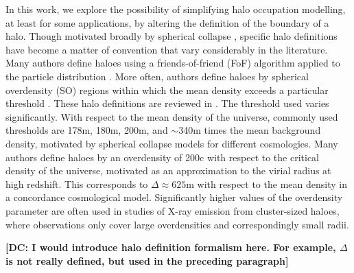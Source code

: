\documentclass[usenatbib,fleqn]{mnras}
\begin{document}
In this work, we explore the possibility of simplifying halo occupation modelling, at least for some applications, by altering the definition of the boundary of a halo. Though motivated broadly by spherical collapse \citep{gunn_gott72, fillmore_goldreich84, ryden_gunn87, lacey_cole93, eke_etal96, mota_vandebruck04, pace_etal10}, specific halo definitions have become a matter of convention that vary considerably in the literature. Many authors define haloes using a friends-of-friend (FoF) algorithm applied to the particle distribution \citep[e.g., ][]{davis_etal85}. More often, authors define haloes by spherical overdensity (SO) regions within which the mean density exceeds a particular threshold \citep[e.g., ][]{lacey_cole93}. These halo definitions are reviewed in \citet[][and references therein]{knebe_etal11}. The threshold used varies significantly. With respect to the mean density of the universe, commonly used thresholds are 178m, 180m, 200m, and $\sim$340m times the mean background density, motivated by spherical collapse models for different cosmologies. Many authors define haloes by an overdensity of 200c with respect to the critical density of the universe, motivated as an approximation to the virial radius at high redshift. This corresponds to $\Delta \approx 625$m with respect to the mean density in a concordance cosmological model. Significantly higher values of the overdensity parameter are often used in studies of X-ray emission from cluster-sized haloes, where observations only cover large overdensities and correspondingly small radii.

{\bf [DC: I would introduce halo definition formalism here. For example, $\Delta$ is not really defined, but used in the preceding paragraph]}
\end{document}

